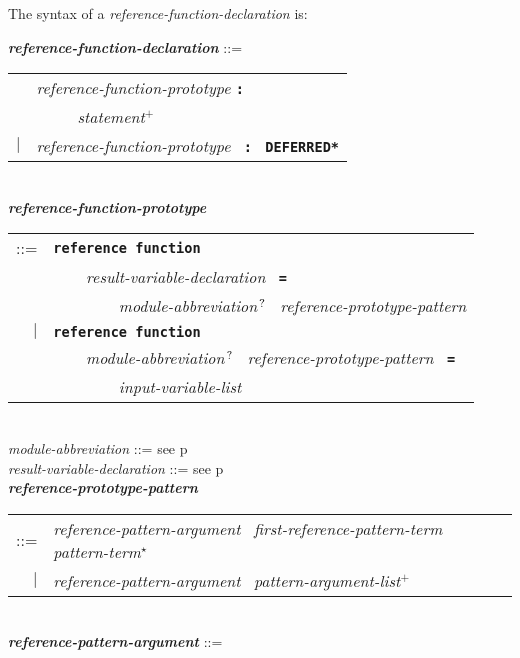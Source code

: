 \documentclass[12pt]{article}
\newcommand{\TT}[1]{{\tt \bfseries #1}}
\newcommand{\STAR}{{\Large $^\star$}}
\newcommand{\PLUS}[1][]{{$^{+#1}$}}
\newcommand{\QMARK}{{$^{\,\mbox{\footnotesize ?}}$}}
\newcommand{\ttkey}[1]{{\tt \bfseries #1}}
\newcommand{\emkey}[1]{{\em \bfseries #1}}
\newcommand{\pagref}[1]{p\pageref{#1}}
\newenvironment{indpar}[1][0.3in]%
	{\begin{list}{}%
		     {\setlength{\itemsep}{0in}%
		      \setlength{\topsep}{0in}%
		      \setlength{\parsep}{1ex}%
		      \setlength{\labelwidth}{#1}%
		      \setlength{\leftmargin}{#1}%
		      \addtolength{\leftmargin}{\labelsep}}%
	 \item}%
	{\end{list}}
\begin{document}
The syntax of a {\em reference-function-declaration} is:

\begin{indpar}[0.1in]
\emkey{reference-function-declaration}\label{REFEREMCE-FUNCTION-DECLARATION}
	::= \\
\hspace*{2em}
    \begin{tabular}[t]{rl}
        &  {\em reference-function-prototype} \TT{:} \\
	& \TT{~~~~~}{\em statement}\PLUS{} \\
    $|$ &  {\em reference-function-prototype}~ \TT{:}~ \ttkey{*DEFERRED*} \\
    \end{tabular}
\\[2ex]
\emkey{reference-function-prototype}\label{REFERENCE-FUNCTION-PROTOTYPE} \\
\hspace*{0.25in}
    \begin{tabular}[t]{rl}
        ::= & \ttkey{reference function} \\
	    & \TT{~~~~}{\em result-variable-declaration}~ \TT{=}~ \\
            & \TT{~~~~~~~~}{\em module-abbreviation}\QMARK{}~
	      {\em reference-prototype-pattern} \\
        $|$ & \ttkey{reference function} \\
            & \TT{~~~~}{\em module-abbreviation}\QMARK{}~
	      {\em reference-prototype-pattern}~ \TT{=}~ \\
	    & \TT{~~~~~~~~}{\em input-variable-list}
    \end{tabular}
\\[0.5ex]
{\em module-abbreviation} ::= see \pagref{MODULE-ABBREVIATION}
\\[0.5ex]
{\em result-variable-declaration} ::= see \pagref{RESULT-VARIABLE-DECLARATION}
\\[0.5ex]
\emkey{reference-prototype-pattern}\label{REFERENCE-PROTOTYPE-PATTERN} \\
\hspace*{2em}\begin{tabular}[t]{rl}
    ::= & {\em reference-pattern-argument}~
          {\em first-reference-pattern-term}~
          {\em pattern-term}\STAR{} \\
    $|$ & {\em reference-pattern-argument}~ {\em pattern-argument-list}\PLUS{}
    \end{tabular}
\\[0.5ex]
\emkey{reference-pattern-argument} ::=

\end{indpar}
\end{document}
